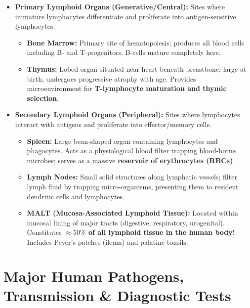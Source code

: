 \documentclass[10pt,a4paper]{article}
\begin{document}
\begin{conceptbox}
\begin{itemize}[leftmargin=*]
  \item \textbf{Primary Lymphoid Organs (Generative/Central):} Sites where immature lymphocytes differentiate and proliferate into antigen-sensitive lymphocytes.
  \begin{itemize}
    \item \textbf{Bone Marrow:} Primary site of hematopoiesis; produces all blood cells including B- and T-progenitors. B-cells mature completely here.
    \item \textbf{Thymus:} Lobed organ situated near heart beneath breastbone; large at birth, undergoes progressive atrophy with age. Provides microenvironment for \textbf{T-lymphocyte maturation and thymic selection}.
  \end{itemize}
  \item \textbf{Secondary Lymphoid Organs (Peripheral):} Sites where lymphocytes interact with antigens and proliferate into effector/memory cells.
  \begin{itemize}
    \item \textbf{Spleen:} Large bean-shaped organ containing lymphocytes and phagocytes. Acts as a physiological blood filter trapping blood-borne microbes; serves as a massive \textbf{reservoir of erythrocytes (RBCs)}.
    \item \textbf{Lymph Nodes:} Small solid structures along lymphatic vessels; filter lymph fluid by trapping micro-organisms, presenting them to resident dendritic cells and lymphocytes.
    \item \textbf{MALT (Mucosa-Associated Lymphoid Tissue):} Located within mucosal lining of major tracts (digestive, respiratory, urogenital). Constitutes \textbf{$\approx 50\%$ of all lymphoid tissue in the human body!} Includes Peyer's patches (ileum) and palatine tonsils.
  \end{itemize}
\end{itemize}
\end{conceptbox}

\section{Major Human Pathogens, Transmission \& Diagnostic Tests}
\end{document}
